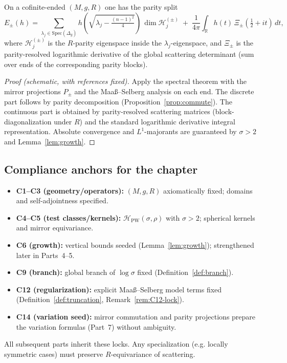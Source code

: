 \begin{proposition}
\label{prop:spectral-Epm}
On a cofinite-ended $(M,g,R)$ one has the parity split
\[
E_\pm(h)=\sum_{\lambda_j\in\mathrm{Spec}(\Delta_g)} h(\sqrt{\lambda_j-\tfrac{(n-1)^2}{4}})\,\dim \mathcal{H}_{j}^{(\pm)}
\;+\; \frac{1}{4\pi}\int_{\mathbb{R}} h(t)\, \Xi_\pm\!\left(\tfrac{1}{2}+it\right)\,dt,
\]
where $\mathcal{H}_{j}^{(\pm)}$ is the $R$-parity eigenspace inside the $\lambda_j$-eigenspace, and $\Xi_\pm$ is the parity-resolved logarithmic derivative of the global scattering determinant (sum over ends of the corresponding parity blocks). %
\end{proposition}

\begin{proof}[Proof (schematic, with references fixed)]
Apply the spectral theorem with the mirror projections $P_\pm$ and the Maaß–Selberg analysis on each end. The discrete part follows by parity decomposition (Proposition~\ref{prop:commute}). The continuous part is obtained by parity-resolved scattering matrices (block-diagonalization under $R$) and the standard logarithmic derivative integral representation. Absolute convergence and $L^1$-majorants are guaranteed by $\sigma>2$ and Lemma~\ref{lem:growth}. %
\end{proof}

\subsection{Compliance anchors for the chapter}
\label{subsec:ch6-part1-compliance} \relax

\begin{remark}
\label{rem:compliance-summary-ch6p1}
\begin{itemize}[leftmargin=*, itemsep=2pt]
  \item \textbf{C1–C3 (geometry/operators):} $(M,g,R)$ axiomatically fixed; domains and self-adjointness specified. %
  \item \textbf{C4–C5 (test classes/kernels):} $\mathcal{H}_{\mathrm{PW}}(\sigma,\rho)$ with $\sigma>2$; spherical kernels and mirror equivariance. %
  \item \textbf{C6 (growth):} vertical bounds seeded (Lemma~\ref{lem:growth}); strengthened later in Parts~4–5. %
  \item \textbf{C9 (branch):} global branch of $\log\sigma$ fixed (Definition~\ref{def:branch}). %
  \item \textbf{C12 (regularization):} explicit Maaß–Selberg model terms fixed (Definition~\ref{def:truncation}, Remark~\ref{rem:C12-lock}). %
  \item \textbf{C14 (variation seed):} mirror commutation and parity projections prepare the variation formulas (Part~7) without ambiguity. %
\end{itemize}
All subsequent parts inherit these locks. Any specialization (e.g. locally symmetric cases) must preserve $R$-equivariance of scattering. %
\end{remark}

